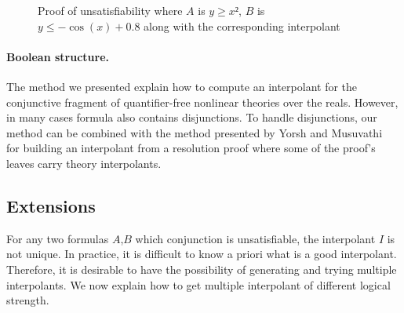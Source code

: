 \begin{example}
\begin{figure}
\caption{Proof of unsatisfiability where $A$ is $y≥x²$, $B$ is $y ≤ -\cos(x) + 0.8$ along with the corresponding interpolant}
\label{fig:proof}
\end{figure}
\end{example}

\paragraph{Boolean structure.}
The method we presented explain how to compute an interpolant for the conjunctive fragment of quantifier-free nonlinear theories over the reals.
However, in many cases formula also contains disjunctions.
To handle disjunctions, our method can be combined with the method presented by Yorsh and Musuvathi~\cite{DBLP:conf/cade/YorshM05} for building an interpolant from a resolution proof where some of the proof's leaves carry theory interpolants.




\subsection{Extensions}

For any two formulas $A$,$B$ which conjunction is unsatisfiable, the interpolant $I$ is not unique.
In practice, it is difficult to know a priori what is a good interpolant.
Therefore, it is desirable to have the possibility of generating and trying multiple interpolants.
We now explain how to get multiple interpolant of different logical strength.


